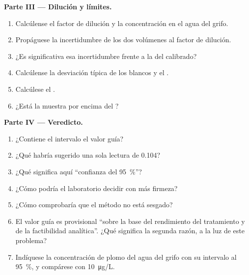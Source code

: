 \begin{problem}
\medskip
\noindent\textbf{Parte III --- Dilución y límites.}
\begin{enumerate}[resume]
  \item Calcúlense el factor de dilución y la concentración en el agua del grifo.
  \item Propáguese la incertidumbre de los dos volúmenes al factor de dilución.
  \item ¿Es significativa esa incertidumbre frente a la del calibrado?
  \item Calcúlense la desviación típica de los blancos y el .
  \item Calcúlese el .
  \item ¿Está la muestra por encima del ?
\end{enumerate}

\medskip
\noindent\textbf{Parte IV --- Veredicto.}
\begin{enumerate}[resume]
  \item ¿Contiene el intervalo el valor guía?
  \item ¿Qué habría sugerido una sola lectura de 0.104?
  \item ¿Qué significa aquí ``confianza del 95~\%''?
  \item ¿Cómo podría el laboratorio decidir con más firmeza?
  \item ¿Cómo comprobaría que el método no está sesgado?
  \item El valor guía es provisional ``sobre la base del rendimiento del tratamiento y de la factibilidad
        analítica''. ¿Qué significa la segunda razón, a la luz de este problema?
  \item Indíquese la concentración de plomo del agua del grifo con su intervalo al 95~\%, y compárese con
        \qty{10}{\micro g/L}.
\end{enumerate}
\end{problem}
